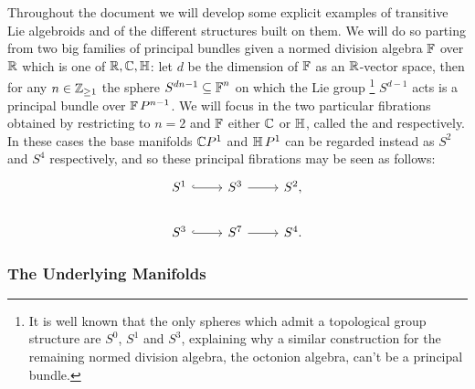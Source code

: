 Throughout the document we will develop some explicit examples of transitive Lie algebroids and of the different structures built on them.  We will do so parting from two big families of principal bundles given a normed division algebra $\operatorname{\mathbb{F}}$ over $\mathbb{R}$ which is one of $\mathbb{R}, \mathbb{C}, \operatorname{\mathbb{H}}$: let $d$ be the dimension of $\operatorname{\mathbb{F}}$ as an $\mathbb{R}$-vector space, then for any $n \in \mathbb{Z}_{\geq 1}$ the sphere $S^{dn - 1} \subseteq \operatorname{\mathbb{F}}^n$ on which the Lie group
\footnote{It is well known that the only spheres which admit a topological group structure are $S^0$, $S^1$ and $S^3$, explaining why a similar construction for the remaining normed division algebra, the octonion algebra, can't be a principal bundle.} 
$S^{d-1}$ acts is a principal bundle over $\operatorname{\mathbb{F}} P^{n-1}$. We will focus in the two particular fibrations obtained by restricting to $n = 2$ and $\operatorname{\mathbb{F}}$ either $\mathbb{C}$ or $\operatorname{\mathbb{H}}$, called the  and  respectively. In these cases the base manifolds $\mathbb{C} P^1$ and $\operatorname{\mathbb{H}} P^1$ can be regarded instead as $S^2$ and $S^4$ respectively, and so these principal fibrations may be seen as follows:
\begin{equation*}
    \begin{tikzcd}
    S^1 \arrow[hook]{r} & S^3 \arrow{r} & S^2,\\
    S^3 \arrow[hook]{r} & S^7 \arrow{r} & S^4.
    \end{tikzcd}
\end{equation*}


\subsubsection{The Underlying Manifolds}

